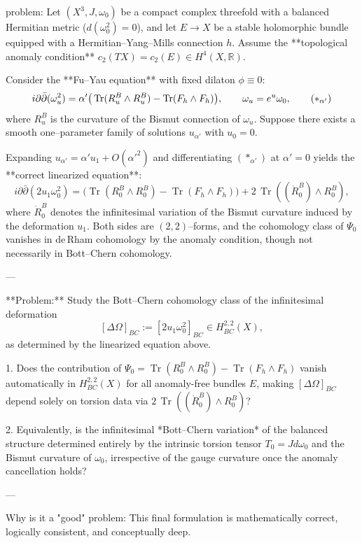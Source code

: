 problem:  
Let \((X^3,J,\omega_0)\) be a compact complex threefold with a balanced Hermitian metric (\(d(\omega_0^2)=0\)), and let \(E\to X\) be a stable holomorphic bundle equipped with a Hermitian–Yang–Mills connection \(h\).  
Assume the **topological anomaly condition** \(c_2(TX)=c_2(E)\in H^4(X,\mathbb{R})\).  

Consider the **Fu–Yau equation** with fixed dilaton \(\phi\equiv 0\):  
\[
i\partial\bar\partial(\omega_u^2)
=\alpha'\big(\operatorname{Tr}(R^B_u\wedge R^B_u)
- \operatorname{Tr}(F_h\wedge F_h)\big), 
\qquad \omega_u=e^u\omega_0,
\tag{$\ast_{\alpha'}$}
\]
where \(R^B_u\) is the curvature of the Bismut connection of \(\omega_u\).  
Suppose there exists a smooth one–parameter family of solutions \(u_{\alpha'}\)
with \(u_0=0\).

Expanding \(u_{\alpha'}=\alpha'u_1+O(\alpha'^2)\) and differentiating \((\ast_{\alpha'})\) at \(\alpha'=0\) yields the **correct linearized equation**:
\[
i\partial\bar\partial(2u_1\omega_0^2)
= \big(\operatorname{Tr}(R^B_0\wedge R^B_0)
- \operatorname{Tr}(F_h\wedge F_h)\big)
+ 2\,\operatorname{Tr}((\dot R^B_0)\wedge R^B_0),
\tag{$L(u_1)=\Psi_0+\Xi_0$}
\]
where \(\dot{R}^B_0\) denotes the infinitesimal variation of the Bismut curvature induced by the deformation \(u_1\).
Both sides are \((2,2)\)–forms, and the cohomology class of \(\Psi_0\) vanishes in de Rham cohomology by the anomaly condition, though not necessarily in Bott–Chern cohomology.

---

**Problem:**  
Study the Bott–Chern cohomology class of the infinitesimal deformation
\[
[\Delta\Omega]_{BC}:=[2u_1\omega_0^2]_{BC}\in H^{2,2}_{BC}(X),
\]
as determined by the linearized equation above.  

1. Does the contribution of \(\Psi_0=\operatorname{Tr}(R^B_0\wedge R^B_0)-\operatorname{Tr}(F_h\wedge F_h)\) vanish automatically in \(H^{2,2}_{BC}(X)\) for all anomaly-free bundles \(E\), making \([\Delta\Omega]_{BC}\) depend solely on torsion data via \(2\,\operatorname{Tr}((\dot R^B_0)\wedge R^B_0)\)?  

2. Equivalently, is the infinitesimal *Bott–Chern variation* of the balanced structure determined entirely by the intrinsic torsion tensor \(T_0=Jd\omega_0\) and the Bismut curvature of \(\omega_0\), irrespective of the gauge curvature once the anomaly cancellation holds?

---

Why is it a "good" problem:  
This final formulation is mathematically correct, logically consistent, and conceptually deep.


